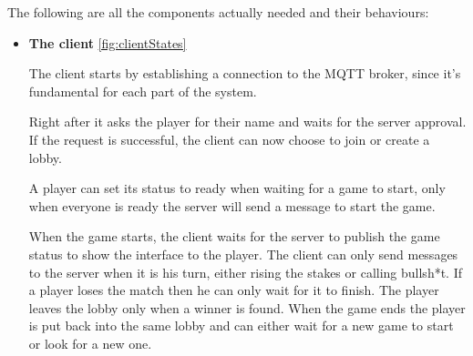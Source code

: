 \documentclass{scrartcl}
\begin{document}
The following are all the components actually needed and their behaviours:
\begin{itemize}
      \item
            \textbf{The client} \cref{fig:clientStates} \par
            The client starts by establishing a connection to the MQTT broker, since it's fundamental
            for each part of the system.

            Right after it asks the player for their name and waits for the server approval.
            If the request is successful, the client can now choose to join or create a lobby.

            A player can set its status to ready when waiting for a game to start, only when everyone
            is ready the server will send a message to start the game.

            When the game starts, the client waits for the server to publish the game status to
            show the interface to the player.
            The client can only send messages to the server when it is his turn, either rising the
            stakes or calling bullsh*t. If a player loses the match then he can only wait for it to
            finish. The player leaves the lobby only when a winner is found. When the game ends the
            player is put back into the same lobby and can either wait for a new game to start or look
            for a new one.


\end{itemize}
\end{document}
